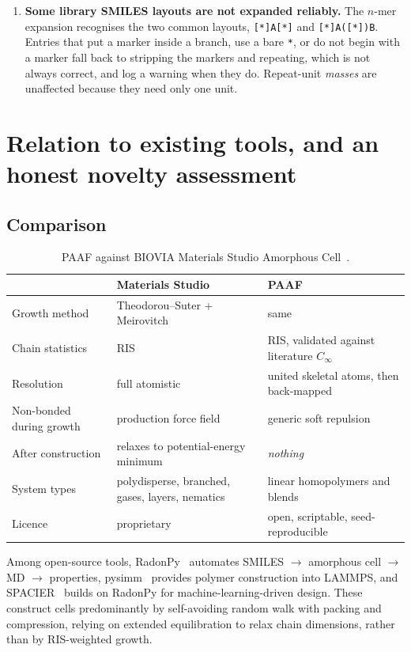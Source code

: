 \documentclass[11pt,a4paper]{article}
\begin{document}
\begin{enumerate}[label=\textbf{L\arabic*.}]
\item \textbf{Some library SMILES layouts are not expanded reliably.}
The $n$-mer expansion recognises the two common layouts, \texttt{[*]A[*]} and
\texttt{[*]A([*])B}. Entries that put a marker inside a branch, use a bare
\texttt{*}, or do not begin with a marker fall back to stripping the markers
and repeating, which is not always correct, and log a warning when they do.
Repeat-unit \emph{masses} are unaffected because they need only one unit.
\end{enumerate}

\section{Relation to existing tools, and an honest novelty assessment}
\label{sec:novelty}

\subsection{Comparison}

\begin{table}[h]
\centering
\small
\begin{tabular}{p{4.3cm}p{4.6cm}p{5.2cm}}
\toprule
 & \textbf{Materials Studio} & \textbf{PAAF} \\
\midrule
Growth method    & Theodorou--Suter + Meirovitch & same \\
Chain statistics & RIS & RIS, validated against literature $C_\infty$ \\
Resolution       & full atomistic & united skeletal atoms, then back-mapped \\
Non-bonded during growth & production force field & generic soft repulsion \\
After construction & relaxes to potential-energy minimum & \emph{nothing} \\
System types     & polydisperse, branched, gases, layers, nematics & linear homopolymers and blends \\
Licence          & proprietary & open, scriptable, seed-reproducible \\
\bottomrule
\end{tabular}
\caption{PAAF against BIOVIA Materials Studio Amorphous Cell~\cite{biovia,accelrys}.}
\end{table}

Among open-source tools, RadonPy~\cite{radonpy} automates SMILES $\rightarrow$
amorphous cell $\rightarrow$ MD $\rightarrow$ properties, pysimm~\cite{pysimm}
provides polymer construction into LAMMPS, and SPACIER~\cite{spacier} builds
on RadonPy for machine-learning-driven design. These construct cells
predominantly by self-avoiding random walk with packing and compression,
relying on extended equilibration to relax chain dimensions, rather than by
RIS-weighted growth.
\end{document}
